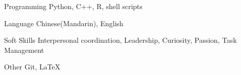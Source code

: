 

\begin{cvskills}

  \cvskill
    {Programming} %
    {Python, C++, R, shell scripts} %
    
  \cvskill
    {Language} %
    {Chinese(Mandarin), English} %
    
  \cvskill
    {Soft Skills} %
    {Interpersonal coordination, Leadership, Curiosity, Passion, Task Management} %
    
  \cvskill
    {Other} %
    {Git, \LaTeX} %

\end{cvskills}
